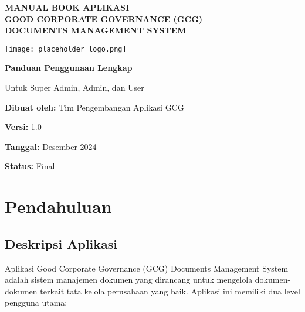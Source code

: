 \documentclass[12pt,a4paper]{article}
\begin{document}
\begin{titlepage}
    \centering
    \vspace*{2cm}
    
    {\Huge\bfseries\color{darkblue} MANUAL BOOK APLIKASI\\[0.5cm] GOOD CORPORATE GOVERNANCE (GCG)\\[0.5cm] DOCUMENTS MANAGEMENT SYSTEM}
    
    \vspace{2cm}
    
    \texttt{[image: placeholder\_logo.png]}
    
    \vspace{2cm}
    
    {\Large\bfseries Panduan Penggunaan Lengkap}
    
    \vspace{1cm}
    
    {\large Untuk Super Admin, Admin, dan User}
    
    \vfill
    
    {\large \textbf{Dibuat oleh:} Tim Pengembangan Aplikasi GCG}
    
    \vspace{0.5cm}
    
    {\large \textbf{Versi:} 1.0}
    
    \vspace{0.5cm}
    
    {\large \textbf{Tanggal:} Desember 2024}
    
    \vspace{0.5cm}
    
    {\large \textbf{Status:} Final}
    
    \vspace{1cm}
    
\end{titlepage}

\tableofcontents
\newpage

\section{Pendahuluan}

\subsection{Deskripsi Aplikasi}
Aplikasi Good Corporate Governance (GCG) Documents Management System adalah sistem manajemen dokumen yang dirancang untuk mengelola dokumen-dokumen terkait tata kelola perusahaan yang baik. Aplikasi ini memiliki dua level pengguna utama:
\end{document}
